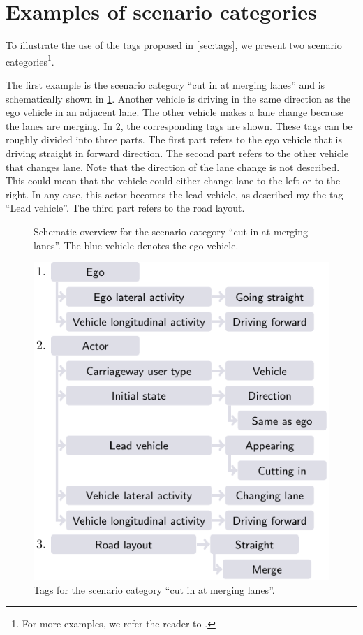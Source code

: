 \section{Examples of scenario categories}
\label{sec:examples}

To illustrate the use of the tags proposed in \cref{sec:tags}, we present two scenario categories\footnote{For more examples, we refer the reader to \autocite{degelder2019scenariocategories}.}.

The first example is the scenario category ``cut in at merging lanes'' and is schematically shown in \cref{fig:scheme cut in}. 
Another vehicle is driving in the same direction as the ego vehicle in an adjacent lane. The other vehicle makes a lane change because the lanes are merging. In \cref{fig:tags cut in}, the corresponding tags are shown. These tags can be roughly divided into three parts. The first part refers to the ego vehicle that is driving straight in forward direction. The second part refers to the other vehicle that changes lane. Note that the direction of the lane change is not described. This could mean that the vehicle could either change lane to the left or to the right. In any case, this actor becomes the lead vehicle, as described my the tag ``Lead vehicle''. The third part refers to the road layout.


\setlength{\figurewidth}{22.5em}
\begin{figure}[t]
	\centering
	
	\caption{Schematic overview for the scenario category ``cut in at merging lanes''. The blue vehicle denotes the ego vehicle.}
	\label{fig:scheme cut in}		
\end{figure}
\begin{figure}[t]
	\centering
	\includegraphics{figures/cutin}
	\caption{Tags for the scenario category ``cut in at merging lanes''.}
	\label{fig:tags cut in}
\end{figure}


